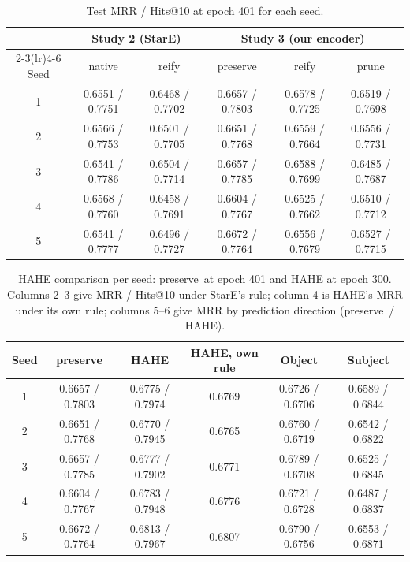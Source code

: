\documentclass[11pt,a4paper]{article}
\newcommand{\hyper}{\textsf{preserve}}
\newcommand{\reif}{\textsf{reify}}
\newcommand{\prune}{\textsf{prune}}
\begin{document}
\begin{table}[h]
\centering
\small
\caption{Test MRR / Hits@10 at epoch 401 for each seed.}
\begin{tabular}{@{}cccccc@{}}
\toprule
& \multicolumn{2}{c}{Study 2 (StarE)} & \multicolumn{3}{c}{Study 3 (our encoder)} \\
\cmidrule(lr){2-3}\cmidrule(lr){4-6}
Seed & native & \reif & \hyper & \reif & \prune \\
\midrule
1 & 0.6551 / 0.7751 & 0.6468 / 0.7702 & 0.6657 / 0.7803 & 0.6578 / 0.7725 & 0.6519 / 0.7698 \\
2 & 0.6566 / 0.7753 & 0.6501 / 0.7705 & 0.6651 / 0.7768 & 0.6559 / 0.7664 & 0.6556 / 0.7731 \\
3 & 0.6541 / 0.7786 & 0.6504 / 0.7714 & 0.6657 / 0.7785 & 0.6588 / 0.7699 & 0.6485 / 0.7687 \\
4 & 0.6568 / 0.7760 & 0.6458 / 0.7691 & 0.6604 / 0.7767 & 0.6525 / 0.7662 & 0.6510 / 0.7712 \\
5 & 0.6541 / 0.7777 & 0.6496 / 0.7727 & 0.6672 / 0.7764 & 0.6556 / 0.7679 & 0.6527 / 0.7715 \\
\bottomrule
\end{tabular}
\end{table}

\begin{table}[h]
\centering
\small
\caption{HAHE comparison per seed: \hyper\ at epoch 401 and HAHE at epoch 300. Columns 2--3 give MRR / Hits@10 under StarE's rule; column 4 is HAHE's MRR under its own rule; columns 5--6 give MRR by prediction direction (\hyper\ / HAHE).}
\begin{tabular}{@{}cccccc@{}}
\toprule
Seed & \hyper & HAHE & HAHE, own rule & Object & Subject \\
\midrule
1 & 0.6657 / 0.7803 & 0.6775 / 0.7974 & 0.6769 & 0.6726 / 0.6706 & 0.6589 / 0.6844 \\
2 & 0.6651 / 0.7768 & 0.6770 / 0.7945 & 0.6765 & 0.6760 / 0.6719 & 0.6542 / 0.6822 \\
3 & 0.6657 / 0.7785 & 0.6777 / 0.7902 & 0.6771 & 0.6789 / 0.6708 & 0.6525 / 0.6845 \\
4 & 0.6604 / 0.7767 & 0.6783 / 0.7948 & 0.6776 & 0.6721 / 0.6728 & 0.6487 / 0.6837 \\
5 & 0.6672 / 0.7764 & 0.6813 / 0.7967 & 0.6807 & 0.6790 / 0.6756 & 0.6553 / 0.6871 \\
\bottomrule
\end{tabular}
\end{table}
\end{document}

